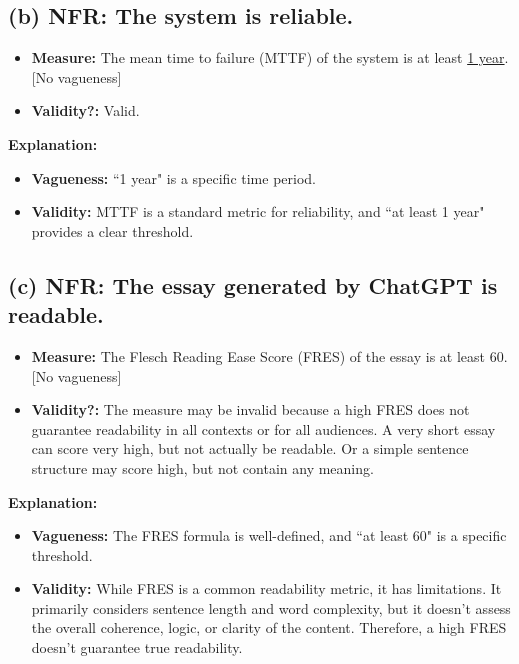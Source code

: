 \documentclass{article}
\begin{document}
\subsection*{(b) NFR: The system is reliable.}

\begin{itemize}
    \item \textbf{Measure:} The mean time to failure (MTTF) of the system is at least \underline{1 year}. [No vagueness]
    \item \textbf{Validity?:} Valid.
\end{itemize}

\textbf{Explanation:}

\begin{itemize}
    \item \textbf{Vagueness:} ``1 year" is a specific time period.
    \item \textbf{Validity:} MTTF is a standard metric for reliability, and ``at least 1 year" provides a clear threshold.
\end{itemize}

\subsection*{(c) NFR: The essay generated by ChatGPT is readable.}

\begin{itemize}
    \item \textbf{Measure:} The Flesch Reading Ease Score (FRES) of the essay is at least 60. [No vagueness]
    \item \textbf{Validity?:} The measure may be invalid because a high FRES does not guarantee readability in all contexts or for all audiences. A very short essay can score very high, but not actually be readable. Or a simple sentence structure may score high, but not contain any meaning.
\end{itemize}

\textbf{Explanation:}

\begin{itemize}
    \item \textbf{Vagueness:} The FRES formula is well-defined, and ``at least 60" is a specific threshold.
    \item \textbf{Validity:} While FRES is a common readability metric, it has limitations. It primarily considers sentence length and word complexity, but it doesn't assess the overall coherence, logic, or clarity of the content. Therefore, a high FRES doesn't guarantee true readability.
\end{itemize}
\end{document}
